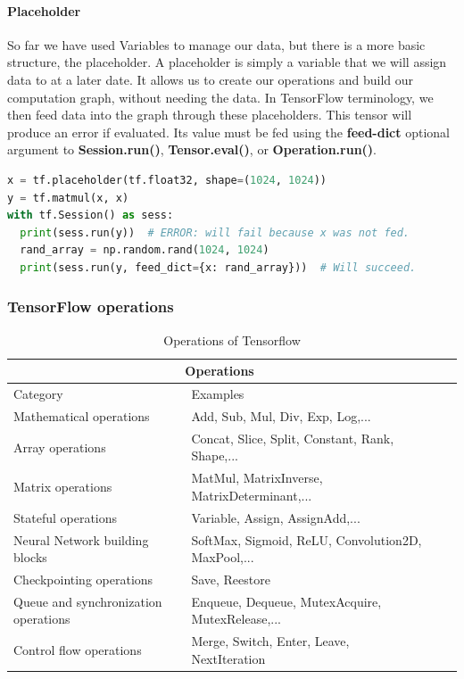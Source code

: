 \paragraph{Placeholder}
So far we have used Variables to manage our data, but there is a more basic structure, the placeholder. A placeholder is simply a variable that we will assign data to at a later date. It allows us to create our operations and build our computation graph, without needing the data. In TensorFlow terminology, we then feed data into the graph through these placeholders.
This tensor will produce an error if evaluated. Its value must be fed using the \textbf{feed-dict} optional argument to \textbf{Session.run()}, \textbf{Tensor.eval()}, or \textbf{Operation.run()}.
\begin{lstlisting}[language=Python]
x = tf.placeholder(tf.float32, shape=(1024, 1024))
y = tf.matmul(x, x)
with tf.Session() as sess:
  print(sess.run(y))  # ERROR: will fail because x was not fed.
  rand_array = np.random.rand(1024, 1024)
  print(sess.run(y, feed_dict={x: rand_array}))  # Will succeed.
\end{lstlisting}
    \subsubsection{TensorFlow operations}
    
    \begin{table}[H] \centering  

\begin{tabular}{ |p{7cm}||p{9cm} |p{3cm}|p{3cm}| }
 \hline
 \multicolumn{2}{|c|}{Operations} \\
 \hline
 
 Category & Examples \\
 \hline
 Mathematical operations & Add, Sub, Mul, Div, Exp, Log,...\\
 Array operations & Concat, Slice, Split, Constant, Rank, Shape,...\\
 Matrix operations & MatMul, MatrixInverse, MatrixDeterminant,...\\
 Stateful operations & Variable, Assign, AssignAdd,...\\
 Neural Network building blocks & SoftMax, Sigmoid, ReLU, Convolution2D, MaxPool,...\\
 Checkpointing operations & Save, Reestore\\
 Queue and synchronization operations & Enqueue, Dequeue, MutexAcquire, MutexRelease,...\\
 Control flow operations & Merge, Switch, Enter, Leave, NextIteration\\
 
 
 \hline
 
\end{tabular}
\caption{Operations of Tensorflow}
\label{table:1}

\end{table}

